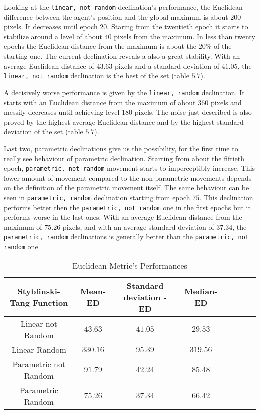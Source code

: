 Looking at the {\tt linear, not random} declination's performance, the Euclidean difference between the agent's position and the global maximum is about $200$ pixels. It decreases until epoch $20$. Staring from the twentieth epoch it starts to stabilize around a level of about $40$ pixels from the maximum. In less than twenty epochs the Euclidean distance from the maximum is about the $20\%$ of the starting one. The current declination reveals a also a great stability. With an average Euclidean distance of $43.63$ pixels and a standard deviation of $41.05$, the {\tt linear, not random} declination is the best of the set (table $5.7$).

A decisively worse performance is given by the {\tt linear, random} declination. It starts with an Euclidean distance from the maximum of about $360$ pixels and messily decreases until achieving level $180$ pixels. The noise just described is also proved by the highest average Euclidean distance and by the highest standard deviation of the set (table $5.7$).

Last two, parametric declinations give us the possibility, for the first time to really see behaviour of parametric declination. Starting from about the fiftieth epoch, {\tt parametric, not random} movement starts to imperceptibly increase. This lower amount of movement compared to the non parametric movements depends on the definition of the parametric movement itself. The same behaviour can be seen in {\tt parametric, random} declination starting from epoch $75$. This declination performs better then the {\tt parametric, not random} one in the first epochs but it performs worse in the last ones. With an average Euclidean distance from the maximum of $75.26$ pixels, and with an average standard deviation of $37.34$, the {\tt parametric, random} declinations is generally better than the {\tt parametric, not random} one.

\begin{table}[h!]
	\centering
	\resizebox{\linewidth}{!} {
		\begin{tabular}{c| ccccccc} 
			\hline \textbf{Styblinski-Tang Function}
			& \textbf{Mean-ED} & \textbf{Standard deviation - ED}  &\textbf{Median-ED} \\ 
			\hline Linear not Random
			& \cellcolor{red!25}$43.63$ & \cellcolor{red!25}$41.05$ & \cellcolor{red!25}$29.53$  \\ 
			\hline Linear Random
			& $330.16$ & $95.39$ & $319.56$ \\ 
			\hline Parametric not Random
			& $91.79$ & $42.24$ & $85.48$ \\ 
			\hline Parametric Random
			& $75.26$ & $37.34$ & $66.42$ \\ 
			\hline 
		\end{tabular} 
	}
	\label{StyblinskiTabEuclidean}
	\caption{Euclidean Metric's Performances}
\end{table}

